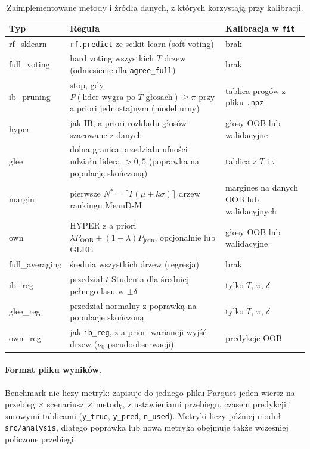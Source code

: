 \documentclass{article}
\newcommand{\code}[1]{\texttt{#1}}
\begin{document}
\begin{table}[H]
\centering
\footnotesize
\caption{Zaimplementowane metody i źródła danych, z których korzystają przy kalibracji.}
\label{tab:metody}
\begin{tabularx}{\textwidth}{@{}>{\ttfamily}lX>{\raggedright\arraybackslash}p{4.3cm}@{}}
\toprule
\normalfont\textbf{Typ} & \textbf{Reguła} & \textbf{Kalibracja w \code{fit}} \\
\midrule
rf\_sklearn & \code{rf.predict} ze scikit-learn (soft voting) & brak \\
full\_voting & hard voting wszystkich $T$ drzew (odniesienie dla \code{agree\_full}) & brak \\
ib\_pruning & stop, gdy $P(\text{lider wygra po } T \text{ głosach}) \ge \pi$ przy a priori jednostajnym (model urny) & tablica progów z pliku \code{.npz} \\
hyper & jak IB, a priori rozkładu głosów szacowane z danych & głosy OOB lub walidacyjne \\
glee & dolna granica przedziału ufności udziału lidera $> 0{,}5$ (poprawka na populację skończoną) & tablica z $T$ i $\pi$ \\
margin & pierwsze $N^* = \lceil T(\mu + k\sigma)\rceil$ drzew rankingu MeanD-M & margines na danych OOB lub walidacyjnych \\
own & HYPER z a priori $\lambda P_{\mathrm{OOB}} + (1-\lambda)P_{\mathrm{jedn}}$, opcjonalnie lub GLEE & głosy OOB lub walidacyjne \\
\midrule
full\_averaging & średnia wszystkich drzew (regresja) & brak \\
ib\_reg & przedział $t$-Studenta dla średniej pełnego lasu w $\pm\delta$ & tylko $T$, $\pi$, $\delta$ \\
glee\_reg & przedział normalny z poprawką na populację skończoną & tylko $T$, $\pi$, $\delta$ \\
own\_reg & jak \code{ib\_reg}, z a priori wariancji wyjść drzew ($\nu_0$ pseudoobserwacji) & predykcje OOB \\
\bottomrule
\end{tabularx}
\end{table}

\paragraph{Format pliku wyników.}
Benchmark nie liczy metryk: zapisuje do jednego pliku Parquet jeden wiersz na
przebieg $\times$ scenariusz $\times$ metodę, z ustawieniami przebiegu, czasem predykcji
i surowymi tablicami (\code{y\_true}, \code{y\_pred}, \code{n\_used}). Metryki liczy
później moduł \code{src/analysis}, dlatego poprawka lub nowa metryka obejmuje także
wcześniej policzone przebiegi.
\end{document}
